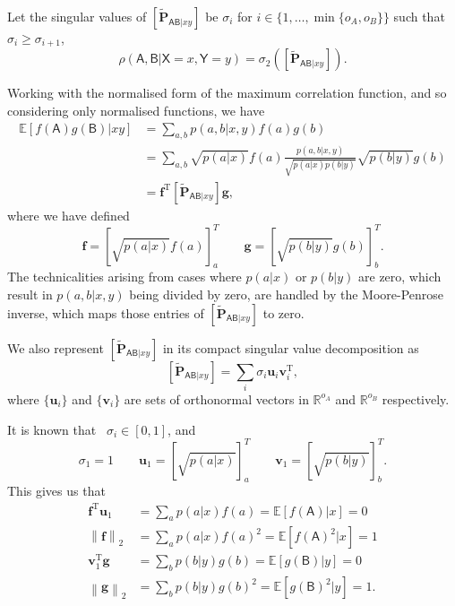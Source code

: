 \documentclass[10pt, a4paper]{article}
\numberwithin{equation}{section} %
\theoremstyle{definition}
\theoremstyle{plain}
\newcommand{\norm}[1]{\left\lVert#1\right\rVert}
\newcommand{\dintv}[2]{\mathopen\{#1,\ldots,#2\mathclose\}}
\newcommand{\?}{\mathrel{?}} %
\newcommand{\R}{\mathbb{R}} %
\newcommand{\cvec}[1]{\boldsymbol{\mathbf{#1}}}    %
\newcommand{\rvec}[1]{\boldsymbol{\mathbf{#1}}^{\mathrm{T}}} %
\newcommand{\matrp}[2]{\left[\mathbf{#1}#2\right]} %
\newcommand{\E}{\mathbb{E}} %
\newcommand{\crv}[1]{\mathsf{#1}}
\begin{document}
    Let the singular values of \(\matrp{\tilde{P}}{_{\crv{AB}|xy}}\) be \(\sigma_i\) for \(i \in \dintv{1}{\min\{o_A, o_B\}}\) such that \(\sigma_{i} \geq \sigma_{i+1}\),
    \begin{equation}
      \rho(\crv{A},\crv{B}|\crv{X}=x,\crv{Y}=y) = \sigma_2\left( \matrp{\tilde{P}}{_{\crv{AB}|xy}} \right).
    \end{equation}

    Working with the normalised form of the maximum correlation function, and so considering only normalised functions, we have
    \begin{align}
      \E[f(\crv{A})g(\crv{B})|xy] &= \sum_{a,b} p(a,b|x,y) f(a)g(b) \\
                      &= \sum_{a,b} \sqrt{p(a|x)} f(a) \frac{p(a,b|x,y)}{\sqrt{p(a|x)p(b|y)}} \sqrt{p(b|y)} g(b) \\
                      &= \rvec{f} \matrp{\tilde{P}}{_{\crv{AB}|xy}} \cvec{g},
    \end{align}
    where we have defined
    \begin{equation}
      \cvec{f} = {[\sqrt{p(a|x)} f(a)]}^T_a \qquad \cvec{g} = {[\sqrt{p(b|y)} g(b)]}^T_b.
    \end{equation}
    The technicalities arising from cases where \(p(a|x)\) or \(p(b|y)\) are zero, which result in \(p(a,b|x,y)\) being divided by zero, are handled by the Moore-Penrose inverse, which maps those entries of \(\matrp{\tilde{P}}{_{\crv{AB}|xy}}\) to zero.

    We also represent \(\matrp{\tilde{P}}{_{\crv{AB}|xy}}\) in its compact singular value decomposition as
    \begin{equation}
      \matrp{\tilde{P}}{_{\crv{AB}|xy}} = \sum_i \sigma_i \cvec{u}_i \rvec{v}_i,
    \end{equation}
    where \(\{\cvec{u}_i\}\) and \(\{\cvec{v}_i\}\) are sets of orthonormal vectors in \(\R^{o_A}\) and \(\R^{o_B}\) respectively.

    It is known that~\cite[Thm 1]{ComputingMaxCorr} \(\sigma_i \in [0, 1]\), and
    \begin{equation}
      \sigma_1 = 1 \qquad \cvec{u}_1 = {[\sqrt{p(a|x)}]}_a^T \qquad \cvec{v}_1 = {[\sqrt{p(b|y)}]}_b^T.
    \end{equation}
    This gives us that
    \begin{align}
      \rvec{f} \cvec{u}_1 &= \sum_a p(a|x) f(a) = \E[f(\crv{A})|x] = 0 \\
      \norm{\cvec{f}}_2 &= \sum_a p(a|x) {f(a)}^2 = \E[{f(\crv{A})}^2|x] = 1 \\
      \rvec{v}_1 \cvec{g} &= \sum_b p(b|y) g(b) = \E[g(\crv{B})|y] = 0 \\
      \norm{\cvec{g}}_2 &= \sum_b p(b|y) {g(b)}^2 = \E[{g(\crv{B})}^2|y] = 1.
    \end{align}
\end{document}
